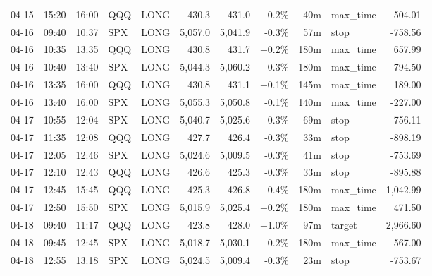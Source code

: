 \documentclass[11pt,a4paper,twoside]{article}
\begin{document}
\begin{center}
\begin{longtable}{>{\color{txtmain}}l l l l l r r r r >{\color{txtmain}}l r}
04-15 & 15:20 & 16:00 & QQQ & LONG & 430.3 & 431.0 & \textcolor{wingreen}{+0.2\%} & 40m & max\_time & \textcolor{wingreen}{504.01} \\
04-16 & 09:40 & 10:37 & SPX & LONG & 5,057.0 & 5,041.9 & \textcolor{lossred}{-0.3\%} & 57m & stop & \textcolor{lossred}{-758.56} \\
04-16 & 10:35 & 13:35 & QQQ & LONG & 430.8 & 431.7 & \textcolor{wingreen}{+0.2\%} & 180m & max\_time & \textcolor{wingreen}{657.99} \\
04-16 & 10:40 & 13:40 & SPX & LONG & 5,044.3 & 5,060.2 & \textcolor{wingreen}{+0.3\%} & 180m & max\_time & \textcolor{wingreen}{794.50} \\
04-16 & 13:35 & 16:00 & QQQ & LONG & 430.8 & 431.1 & \textcolor{wingreen}{+0.1\%} & 145m & max\_time & \textcolor{wingreen}{189.00} \\
04-16 & 13:40 & 16:00 & SPX & LONG & 5,055.3 & 5,050.8 & \textcolor{lossred}{-0.1\%} & 140m & max\_time & \textcolor{lossred}{-227.00} \\
04-17 & 10:55 & 12:04 & SPX & LONG & 5,040.7 & 5,025.6 & \textcolor{lossred}{-0.3\%} & 69m & stop & \textcolor{lossred}{-756.11} \\
04-17 & 11:35 & 12:08 & QQQ & LONG & 427.7 & 426.4 & \textcolor{lossred}{-0.3\%} & 33m & stop & \textcolor{lossred}{-898.19} \\
04-17 & 12:05 & 12:46 & SPX & LONG & 5,024.6 & 5,009.5 & \textcolor{lossred}{-0.3\%} & 41m & stop & \textcolor{lossred}{-753.69} \\
04-17 & 12:10 & 12:43 & QQQ & LONG & 426.6 & 425.3 & \textcolor{lossred}{-0.3\%} & 33m & stop & \textcolor{lossred}{-895.88} \\
04-17 & 12:45 & 15:45 & QQQ & LONG & 425.3 & 426.8 & \textcolor{wingreen}{+0.4\%} & 180m & max\_time & \textcolor{wingreen}{1,042.99} \\
04-17 & 12:50 & 15:50 & SPX & LONG & 5,015.9 & 5,025.4 & \textcolor{wingreen}{+0.2\%} & 180m & max\_time & \textcolor{wingreen}{471.50} \\
04-18 & 09:40 & 11:17 & QQQ & LONG & 423.8 & 428.0 & \textcolor{wingreen}{+1.0\%} & 97m & target & \textcolor{wingreen}{2,966.60} \\
04-18 & 09:45 & 12:45 & SPX & LONG & 5,018.7 & 5,030.1 & \textcolor{wingreen}{+0.2\%} & 180m & max\_time & \textcolor{wingreen}{567.00} \\
04-18 & 12:55 & 13:18 & SPX & LONG & 5,024.5 & 5,009.4 & \textcolor{lossred}{-0.3\%} & 23m & stop & \textcolor{lossred}{-753.67} \\

\end{longtable}
\end{center}
\end{document}
